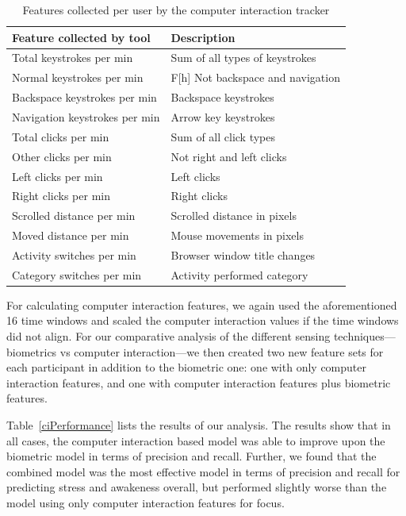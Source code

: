 \begin{table}
\begin{center}
\small\addtolength{\tabcolsep}{-1pt}
\begin{tabular}{l l}
\hline

Feature collected by tool & Description \\ 
\hline
Total keystrokes per min& Sum of all types of keystrokes \\ 
Normal keystrokes per min&F[h] Not backspace and navigation \\ 
Backspace keystrokes per min& Backspace keystrokes \\ 
Navigation keystrokes per min& Arrow key keystrokes \\ 
Total clicks per min& Sum of all click types \\ 
Other clicks per min& Not right and left clicks \\ 
Left clicks per min& Left clicks \\ 
Right clicks per min& Right clicks \\ 
Scrolled distance per min& Scrolled distance in pixels \\ 
Moved distance per min& Mouse movements in pixels \\ 
Activity switches per min& Browser window title changes \\ 
Category switches per min& Activity performed category \\ 
\hline
\end{tabular}
\caption{Features collected per user by the computer interaction tracker}%
\label{tracker}
\end{center}
\end{table}

For calculating computer interaction features, we again used the aforementioned 16 time windows and scaled the computer interaction values if the time windows did not align. For our comparative analysis of the different sensing techniques---biometrics vs computer interaction---we then created two new feature sets for each participant in addition to the biometric one: one with only computer interaction features, and one with computer interaction features plus biometric features. 

Table~\ref{ciPerformance} lists the results of our analysis. The results show that in all cases, the computer interaction based model was able to improve upon the biometric model in terms of precision and recall.
Further, we found that the combined model was the most effective model in terms of precision and recall for predicting stress and awakeness overall, but performed slightly worse than the model using only computer interaction features for focus. 


